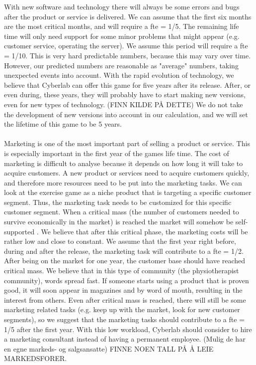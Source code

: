 With new software and technology there will always be some errors and bugs after the product or service is delivered. We can assume that the first six months are the most critical months, and will require a \ac{fte} = 1/5. The remaining life time will only need support for some minor problems that might appear (e.g. customer service, operating the server). We assume this period will require a \ac{fte} = 1/10. This is very hard predictable numbers, because this may vary over time. However, our predicted numbers are reasonable as "average" numbers, taking unexpected events into account. With the rapid evolution of technology, we believe that Cyberlab can offer this game for five years after its release. After, or even during, these years, they will probably have to start making new versions, even for new types of technology. (FINN KILDE PÅ DETTE) We do not take the development of new versions into account in our calculation, and we will set the lifetime of this game to be 5 years. \\ \\
Marketing is one of the most important part of selling a product or service. This is especially important in the first year of the games life time. The cost of marketing is difficult to analyse because it depends on how long it will take to acquire customers. A new product or services need to acquire customers quickly, and therefore more resources need to be put into the marketing tasks. We can look at the exercise game as a niche product that is targeting a specific customer segment. Thus, the marketing task needs to be customized for this specific customer segment. When a critical mass (the number of customers needed to survive economically in the market) is reached the market will somehow be self-supported \cite{informationrules}. We believe that after this critical phase, the marketing costs will be rather low and close to constant. We assume that the first year right before, during and after the release, the marketing task will contribute to a \ac{fte} = 1/2. After being on the market for one year, the customer base should have reached critical mass.  We believe that in this type of community (the physiotherapist community), words spread fast. If someone starts using a product that is proven good, it will soon appear in magazines and by word of mouth, resulting in the interest from others. Even after critical mass is reached, there will still be some marketing related tasks (e.g. keep up with the market, look for new customer segments), so we suggest that the marketing tasks should contribute to a \ac{fte} = 1/5 after the first year. With this low workload, Cyberlab should consider to hire a marketing consultant instead of having a permanent employee. (Mulig de har en egne markeds- og salgsansatte) FINNE NOEN TALL PÅ Å LEIE MARKEDSFORER.\\ \\
